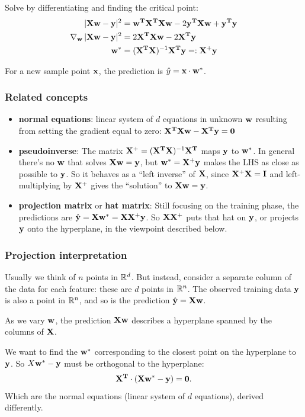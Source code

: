 \documentclass[12pt]{article}
\begin{document}
Solve by differentiating and finding the critical point:
\begin{align*}
  |\mathbf X \mathbf w - \mathbf y|^2          &= \mathbf w^{\mathbf{T}}\mathbf X^{\mathbf{T}}\mathbf X\mathbf w - 2\mathbf y^{\mathbf{T}}\mathbf X\mathbf w + \mathbf y^{\mathbf{T}}\mathbf y \\
  \operatorname{\nabla}_\mathbf w |\mathbf X \mathbf w - \mathbf y|^2 &= 2 \mathbf X^{\mathbf{T}}\mathbf X\mathbf w - 2\mathbf X^{\mathbf{T}}\mathbf y \\
  \mathbf w^*                    &= (\mathbf X^{\mathbf{T}}\mathbf X)^{-1}\mathbf X^{\mathbf{T}}\mathbf y =: \mathbf X^+\mathbf y
\end{align*}
\begin{mdframed}
For a new sample point $\mathbf x$, the prediction is $\hat y = \mathbf x \cdot \mathbf w^*$.
\end{mdframed}

\subsubsection*{Related concepts}
\begin{itemize}
\item \textbf{normal equations}: linear system of $d$ equations in unknown $\mathbf w$ resulting from
  setting the gradient equal to zero: $\mathbf X^{\mathbf{T}}\mathbf X\mathbf w - \mathbf X^{\mathbf{T}}\mathbf y = \mathbf 0$
\item \textbf{pseudoinverse}: The matrix $\mathbf X^+ = (\mathbf X^{\mathbf{T}}\mathbf X)^{-1}\mathbf X^{\mathbf{T}}$ maps $\mathbf y$
  to $\mathbf w^*$. In general there's no $\mathbf w$ that solves $\mathbf X\mathbf w = \mathbf y$, but
  $\mathbf w^* = \mathbf X^+\mathbf y$ makes the LHS as close as possible to $\mathbf y$. So it behaves as
  a ``left inverse'' of $\mathbf X$, since $\mathbf X^+\mathbf X = \mathbf I$ and left-multiplying by $\mathbf X^+$
  gives the ``solution'' to $\mathbf X\mathbf w = \mathbf y$.
\item \textbf{projection matrix} or \textbf{hat matrix}: Still focusing on the
  training phase, the predictions are $\hat {\mathbf y} = \mathbf X\mathbf w^* = \mathbf X\mathbf X^+\mathbf y$. So
  $\mathbf X\mathbf X^+$ puts that hat on $\mathbf y$, or projects $\mathbf y$ onto the hyperplane, in the
  viewpoint described below.
\end{itemize}

\subsubsection*{Projection interpretation}
Usually we think of $n$ points in $\mathbb{R}^d$. But instead, consider a separate
column of the data for each feature: these are $d$ points in $\mathbb{R}^n$. The
observed training data $\mathbf y$ is also a point in $\mathbb{R}^n$, and so is the prediction
$\hat {\mathbf y} = \mathbf X\mathbf w$.

As we vary $\mathbf w$, the prediction $\mathbf X\mathbf w$ describes a hyperplane spanned by the
columns of $\mathbf X$.

We want to find the $\mathbf w^*$ corresponding to the closest point on the hyperplane
to $\mathbf y$. So $X\mathbf w^* - \mathbf y$ must be orthogonal to the hyperplane:
\begin{align*}
  \mathbf X^{\mathbf{T}} \cdot (\mathbf X\mathbf w^* - \mathbf y) = \mathbf 0.
\end{align*}
Which are the normal equations (linear system of $d$ equations), derived
differently.
\end{document}
